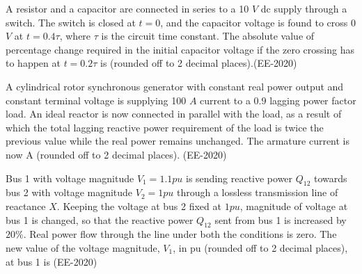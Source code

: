 \item A resistor and a capacitor are connected in series to a 10 $V$ dc supply through a switch. The switch is closed at $t = 0$, and the capacitor voltage is found to cross 0 $V$ at $t = 0.4\tau$, where $\tau$ is the circuit time constant. The absolute value of percentage change required in the initial capacitor voltage if the zero crossing has to happen at $t = 0.2\tau$ is \underline{\hspace{2cm}} (rounded off to 2 decimal places).\hfill(EE-2020)
\item A cylindrical rotor synchronous generator with constant real power output and constant terminal voltage is supplying 100 $A$ current to a $0.9$ lagging power factor load. An ideal reactor is now connected in parallel with the load, as a result of which the total lagging reactive power requirement of the load is twice the previous value while the real power remains unchanged. The armature current is now \underline{\hspace{2cm}} A (rounded off to 2 decimal places). \hfill(EE-2020)
\item Bus 1 with voltage magnitude $V_1 = 1.1 pu$ is sending reactive power $Q_{12}$ towards bus 2 with voltage magnitude $V_2 = 1 pu$ through a lossless transmission line of reactance $X$. Keeping the voltage at bus 2 fixed at $1 pu$, magnitude of voltage at bus 1 is changed, so that the reactive power $Q_{12}$ sent from bus 1 is increased by $20\%$. Real power flow through the line under both the conditions is zero. The new value of the voltage magnitude, $V_1$, in pu (rounded off to 2 decimal places), at bus 1 is \hfill(EE-2020)





\begin{figure}[!ht]
    \centering
    
    
\end{figure}







